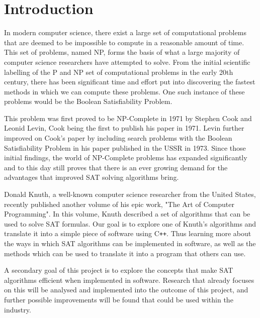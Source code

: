 \documentclass{article}
\begin{document}
\newpage

\thispagestyle{empty}
\tableofcontents

\newpage

\section{Introduction}
In modern computer science, there exist a large set of computational problems that are deemed to be impossible to compute in a reasonable
amount of time. This set of problems, named NP, forms the basis of what a large majority of computer science researchers have attempted to
solve. From the initial scientific labelling of the P and NP set of computational problems in the early 20th century\cite{pvsnp}, there has been
significant time and effort put into discovering the fastest methods in which we can compute these problems. One such instance of these
problems would be the Boolean Satisfiability Problem.

This problem was first proved to be NP-Complete in 1971 by Stephen Cook and Leonid Levin, Cook being the first to publish his paper in
1971\cite{scook}. Levin further improved on Cook's paper by including search problems with the Boolean Satisfiability Problem in his paper published
in the USSR in 1973\cite{levin}. Since those initial findings, the world of NP-Complete problems has expanded significantly and to this day still
proves that there is an ever growing demand for the advantages that improved SAT solving algorithms bring.

Donald Knuth, a well-known computer science researcher from the United States, recently published another volume of his epic work, "The Art
of Computer Programming". In this volume, Knuth described a set of algorithms that can be used to solve SAT formulas. Our goal is to
explore one of Knuth's algorithms and translate it into a simple piece of software using C\texttt{++}. Thus learning more about the ways in which
SAT algorithms can be implemented in software, as well as the methods which can be used to translate it into a program that others can use.

A secondary goal of this project is to explore the concepts that make SAT algorithms efficient when implemented in software. Research that
already focuses on this will be analysed and implemented into the outcome of this project, and further possible improvements will be found
that could be used within the industry.

\newpage
\end{document}
